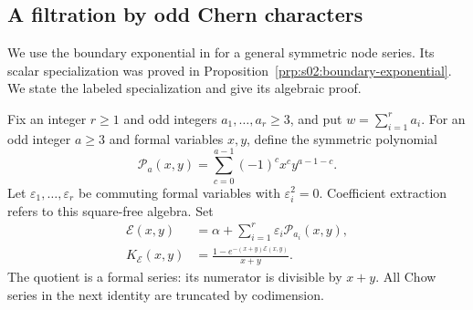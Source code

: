 \subsection{A filtration by odd Chern characters}
\label{subsec:s05:01}

We use the boundary exponential in
\cite[Lemma~3.10, (3.18)--(3.21)]{ABCDGLW23} for a general symmetric
node series. Its scalar specialization was proved in
Proposition~\ref{prp:s02:boundary-exponential}. We state the labeled
specialization and give its algebraic proof.

Fix an integer $r\geq1$ and odd integers $a_1,\ldots,a_r\geq3$,
and put $w=\sum_{i=1}^r a_i$. For an odd integer $a\geq3$ and formal variables $x,y$, define
the symmetric polynomial
\begin{equation}\label{eq:s05:node-polynomial}
 \mathcal P_a(x,y)=\sum_{c=0}^{a-1}(-1)^c x^c y^{a-1-c}.
\end{equation}
Let $\varepsilon_1,\ldots,\varepsilon_r$ be commuting formal
variables with $\varepsilon_i^2=0$. Coefficient extraction refers to
this square-free algebra. Set
\begin{equation}\label{eq:s05:source-kernel}
\begin{split}
 \mathcal E(x,y)&=\alpha+
       \sum_{i=1}^r\varepsilon_i\mathcal P_{a_i}(x,y),\\
 K_{\mathcal E}(x,y)&=
       \frac{1-e^{-(x+y)\mathcal E(x,y)}}{x+y}.
\end{split}
\end{equation}
The quotient is a formal series: its numerator is divisible by $x+y$.
All Chow series in the next identity are truncated by codimension.

